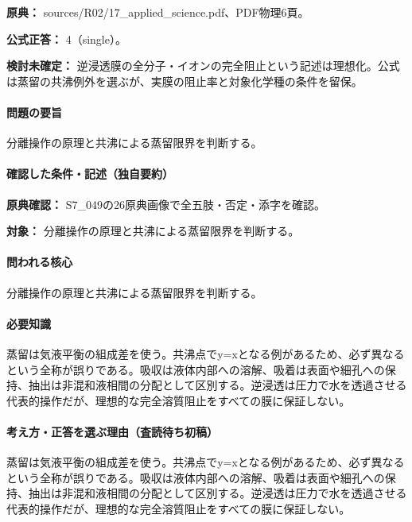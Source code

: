 \noindent\textbf{原典：} sources/R02/17\_applied\_science.pdf、PDF物理6頁。

\textbf{公式正答：} 4（single）。

\par\textbf{検討未確定：} 逆浸透膜の全分子・イオンの完全阻止という記述は理想化。公式は蒸留の共沸例外を選ぶが、実膜の阻止率と対象化学種の条件を留保。

\paragraph{問題の要旨} 分離操作の原理と共沸による蒸留限界を判断する。

\paragraph{確認した条件・記述（独自要約）}\mbox{}\par

\noindent\textbf{原典確認：} S7\_049の26原典画像で全五肢・否定・添字を確認。\par

\noindent\textbf{対象：} 分離操作の原理と共沸による蒸留限界を判断する。\par

\paragraph{問われる核心} 分離操作の原理と共沸による蒸留限界を判断する。

\paragraph{必要知識} 蒸留は気液平衡の組成差を使う。共沸点でy=\allowbreak{}xとなる例があるため、必ず異なるという全称が誤りである。吸収は液体内部への溶解、吸着は表面や細孔への保持、抽出は非混和液相間の分配として区別する。逆浸透は圧力で水を透過させる代表的操作だが、理想的な完全溶質阻止をすべての膜に保証しない。

\paragraph{考え方・正答を選ぶ理由（査読待ち初稿）} 蒸留は気液平衡の組成差を使う。共沸点でy=\allowbreak{}xとなる例があるため、必ず異なるという全称が誤りである。吸収は液体内部への溶解、吸着は表面や細孔への保持、抽出は非混和液相間の分配として区別する。逆浸透は圧力で水を透過させる代表的操作だが、理想的な完全溶質阻止をすべての膜に保証しない。


